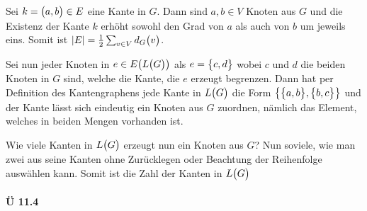 \documentclass{scrreprt}
\begin{document}
Sei $k = \qty\big(a, b) \in E$ eine Kante in $G$.
Dann sind $a, b \in V$ Knoten aus $G$ und die Existenz der Kante $k$ erhöht sowohl
den Grad von $a$ als auch von $b$ um jeweils eins.
Somit ist $\abs{E} = \frac{1}{2}\sum_{v \in V}d_G\qty\big(v)$.

Sei nun jeder Knoten in $e \in E\qty(L\qty\big(G))$ als $e = \qty\big{c, d}$
wobei $c$ und $d$ die beiden Knoten in $G$ sind, welche die Kante, die $e$
erzeugt begrenzen.
Dann hat per Definition des Kantengraphens jede Kante in $L\qty\big(G)$ die
Form $\qty{\qty\big{a, b}, \qty\big{b, c}}$ und der Kante lässt sich eindeutig
ein Knoten aus $G$ zuordnen, nämlich das Element, welches in beiden Mengen
vorhanden ist.

Wie viele Kanten in $L\qty\big(G)$ erzeugt nun ein Knoten aus $G$?
Nun soviele, wie man zwei aus seine Kanten ohne Zurücklegen oder Beachtung der
Reihenfolge auswählen kann.
Somit ist die Zahl der Kanten in $L\qty\big(G)$

\newpage
\paragraph{Ü 11.4} \phantom{\null}
\end{document}
